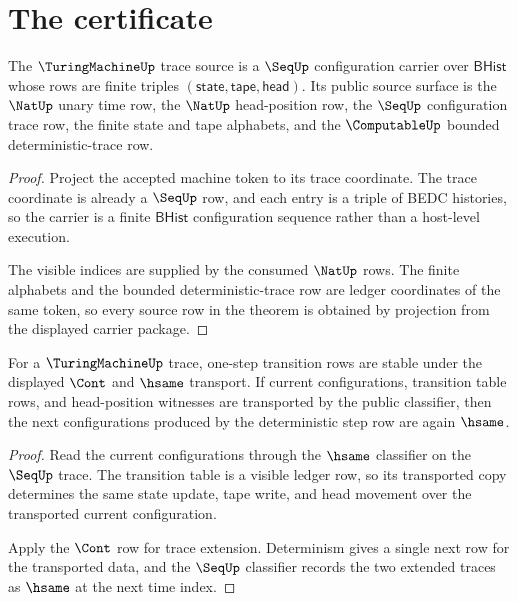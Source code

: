 \section{The certificate}
\label{sec:turingmachine-certificate}

\begin{theorem}
\label{thm:turingmachine-trace-source-obligation}
The $\TuringMachineUp$ trace source is a $\SeqUp$ configuration carrier over
$\mathsf{BHist}$ whose rows are finite triples
$(\mathsf{state},\mathsf{tape},\mathsf{head})$. Its public source surface is
the $\NatUp$ unary time row, the $\NatUp$ head-position row, the $\SeqUp$
configuration trace row, the finite state and tape alphabets, and the
$\ComputableUp$ bounded deterministic-trace row.
\end{theorem}
\begin{proof}
Project the accepted machine token to its trace coordinate. The trace coordinate
is already a $\SeqUp$ row, and each entry is a triple of BEDC histories, so the
carrier is a finite $\mathsf{BHist}$ configuration sequence rather than a
host-level execution.

The visible indices are supplied by the consumed $\NatUp$ rows. The finite
alphabets and the bounded deterministic-trace row are ledger coordinates of the
same token, so every source row in the theorem is obtained by projection from
the displayed carrier package.
\end{proof}

\begin{theorem}
\label{thm:turingmachine-deterministic-step-stability}
For a $\TuringMachineUp$ trace, one-step transition rows are stable under the
displayed $\Cont$ and $\hsame$ transport. If current configurations, transition
table rows, and head-position witnesses are transported by the public
classifier, then the next configurations produced by the deterministic step row
are again $\hsame$.
\end{theorem}
\begin{proof}
Read the current configurations through the $\hsame$ classifier on the
$\SeqUp$ trace. The transition table is a visible ledger row, so its transported
copy determines the same state update, tape write, and head movement over the
transported current configuration.

Apply the $\Cont$ row for trace extension. Determinism gives a single next row
for the transported data, and the $\SeqUp$ classifier records the two extended
traces as $\hsame$ at the next time index.
\end{proof}

